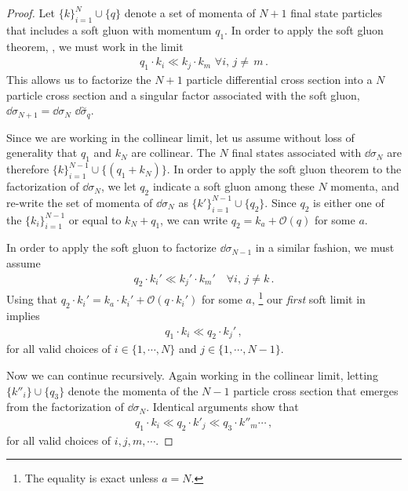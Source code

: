 \begin{proof}
    Let \(\{k\}_{i=1}^{N}\cup\{q\}\) denote a set of momenta of \(N+1\) final state particles that includes a soft gluon with momentum \(q_1\).
    In order to apply the soft gluon theorem, , we must work in the limit
    \begin{align}
        \label{eq:first-soft-limit}
        q_1 \cdot k_i \ll k_j \cdot k_m \,\, \forall i,\,j\neq\,m
        \,.
    \end{align}
    This allows us to factorize the \(N+1\) particle differential cross section into a \(N\) particle cross section and a singular factor associated with the soft gluon, \(\dd \sigma_{N+1} = \dd \sigma_{N}\,\, \dd \overset{\sim}{\sigma}_q\).

    Since we are working in the collinear limit, let us assume without loss of generality that \(q_1\) and \(k_{N}\) are collinear.
    The \(N\) final states associated with \(\dd\sigma_{N}\) are therefore \(\{k\}_{i=1}^{N-1} \cup \{(q_1 + k_N)\}\).
    In order to apply the soft gluon theorem to the factorization of \(\dd \sigma_N\), we let \(q_2\) indicate a soft gluon among these \(N\) momenta, and re-write the set of momenta of \(\dd\sigma_N\) as \(\{k'\}_{i=1}^{N-1} \cup \{q_2\}\).
    Since \(q_2\) is either one of the \(\{k_i\}_{i = 1}^{N-1}\) or equal to \(k_N+q_1\), we can write \(q_2 = k_a + \mathcal{O}(q)\) for some \(a\).

    In order to apply the soft gluon to factorize \(\dd \sigma_{N-1}\) in a similar fashion, we must assume
    \begin{align}
        q_2 \cdot k_i' \ll k_j'\cdot k_m' \quad \forall i,\,j\neq k
        \,.
    \end{align}
    Using that \(q_2\cdot k_i' = k_a \cdot k_i' + \mathcal{O}(q \cdot k_i')\) for some \(a\),%
    \footnote{The equality is exact unless \(a = N\).}
    our \textit{first} soft limit in  implies
    \begin{align}
        q_1\cdot k_i \ll q_2 \cdot k_j'
        \,,
     \end{align}
     for all valid choices of \(i \in \{1,\cdots, N\}\) and \(j \in \{1,\cdots,N-1\}\).

     Now we can continue recursively.
     Again working in the collinear limit, letting \(\{k''_i\} \cup \{q_3\}\) denote the momenta of the \(N-1\) particle cross section that emerges from the factorization of \(\dd\sigma_N\).
     Identical arguments show that
     \begin{align}
         \label{eq:lorentz-invariant-energy-ordering}
         q_1 \cdot k_i \ll q_2 \cdot k'_j \ll q_3 \cdot k''_m \cdots
         \,,
     \end{align}
     for all valid choices of \(i, j, m, \cdots\).


\end{proof}
